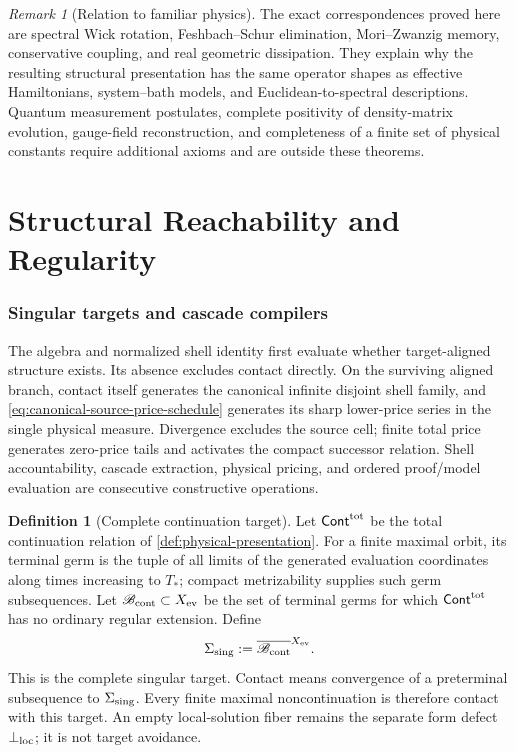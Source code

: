 \documentclass[11pt]{article}
\numberwithin{section}{part}
\theoremstyle{plain}
\theoremstyle{definition}
\newtheorem{definition}[definition]{Definition}
\theoremstyle{remark}
\newtheorem{remark}[remark]{Remark}
\begin{document}
\begin{remark}[Relation to familiar physics]
\label{rem:wick-physics-scope}
The exact correspondences proved here are spectral Wick rotation,
Feshbach--Schur elimination, Mori--Zwanzig memory, conservative coupling,
and real geometric dissipation.  They explain why the resulting structural
presentation has the same operator shapes as effective Hamiltonians,
system--bath models, and Euclidean-to-spectral descriptions.  Quantum
measurement postulates, complete positivity of density-matrix evolution,
gauge-field reconstruction, and completeness of a finite set of physical
constants require additional axioms and are outside these theorems.
\end{remark}

\FloatBarrier


\part{Structural Reachability and Regularity}
\label{part:regularity}

\section{Singular targets and cascade compilers}
\label{sec:singular-cascade}

The algebra and normalized shell identity first evaluate whether
target-aligned structure exists.  Its absence excludes contact directly.
On the surviving aligned branch, contact itself generates the canonical
infinite disjoint shell family, and
\eqref{eq:canonical-source-price-schedule} generates its sharp lower-price
series in the single physical measure.  Divergence excludes the source cell;
finite total price generates zero-price tails and activates the compact
successor relation.  Shell accountability, cascade extraction, physical
pricing, and ordered proof/model evaluation are consecutive constructive
operations.

\begin{definition}[Complete continuation target]
\label{def:singular-target}
Let \(\mathsf{Cont}^{\rm tot}\) be the total continuation relation of
\cref{def:physical-presentation}.  For a finite maximal orbit, its terminal
germ is the tuple of all limits of the generated evaluation coordinates along
times increasing to \(T_*\); compact metrizability supplies such germ
subsequences.  Let \(\mathscr B_{\rm cont}\subset X_{\rm ev}\) be the set of
terminal germs for which \(\mathsf{Cont}^{\rm tot}\) has no ordinary regular
extension.  Define
\begin{equation}
 \label{eq:complete-continuation-target}
 \Sigma_{\rm sing}:=\overline{\mathscr B_{\rm cont}}^{X_{\rm ev}}.
\end{equation}
This is the complete singular target.  Contact means convergence of a
preterminal subsequence to \(\Sigma_{\rm sing}\).  Every finite maximal
noncontinuation is therefore contact with this target.  An empty local-solution
fiber remains the separate form defect \(\bot_{\rm loc}\); it is not target
avoidance.
\end{definition}
\end{document}
